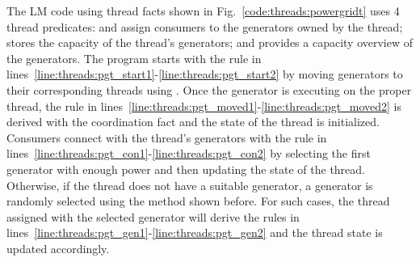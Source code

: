 The LM code using thread facts shown in Fig.~\ref{code:threads:powergridt} uses
4 thread predicates:  and
 assign consumers to the generators owned by the
thread;  stores the capacity of the thread's generators;
and  provides a capacity overview of the generators.
The program starts with the rule in
lines~\ref{line:threads:pgt_start1}-\ref{line:threads:pgt_start2} by moving
generators to their corresponding threads using . Once the
generator is executing on the proper thread, the rule in
lines~\ref{line:threads:pgt_moved1}-\ref{line:threads:pgt_moved2} is derived
with the  coordination fact and the state of the thread is
initialized. Consumers connect with the thread's generators with the rule in
lines~\ref{line:threads:pgt_con1}-\ref{line:threads:pgt_con2} by selecting the
first generator with enough power and then updating the state of the thread.
Otherwise, if the thread does not have a suitable generator, a generator is
randomly selected using the method shown before. For such cases, the thread
assigned with the selected generator will derive the rules in
lines~\ref{line:threads:pgt_gen1}-\ref{line:threads:pgt_gen2} and the thread
state is updated accordingly.

